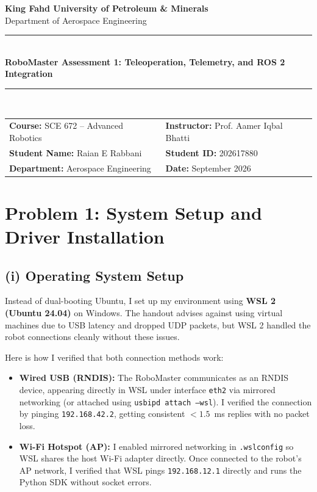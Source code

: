 \documentclass[11pt,a4paper]{article}
\begin{document}
\begin{center}
    {\Large \textbf{King Fahd University of Petroleum \& Minerals}}\\[0.15cm]
    {\large Department of Aerospace Engineering}\\[0.25cm]
    \rule{\textwidth}{0.8pt}\\[0.25cm]
    {\LARGE \textbf{RoboMaster Assessment 1: Teleoperation, Telemetry, and ROS 2 Integration}}\\[0.25cm]
    \rule{\textwidth}{0.8pt}\\[0.3cm]
    \begin{tabular}{ll}
        \textbf{Course:} SCE 672 -- Advanced Robotics & \textbf{Instructor:} Prof. Aamer Iqbal Bhatti \\
        \textbf{Student Name:} Raian E Rabbani & \textbf{Student ID:} 202617880 \\
        \textbf{Department:} Aerospace Engineering & \textbf{Date:} September 2026
    \end{tabular}
\end{center}
\vspace{0.2cm}

\section*{Problem 1: System Setup and Driver Installation}

\subsection*{(i) Operating System Setup}
Instead of dual-booting Ubuntu, I set up my environment using \textbf{WSL 2 (Ubuntu 24.04)} on Windows. The handout advises against using virtual machines due to USB latency and dropped UDP packets, but WSL 2 handled the robot connections cleanly without these issues.

Here is how I verified that both connection methods work:
\begin{itemize}[noitemsep,topsep=2pt]
    \item \textbf{Wired USB (RNDIS):} The RoboMaster communicates as an RNDIS device, appearing directly in WSL under interface \texttt{eth2} via mirrored networking (or attached using \texttt{usbipd attach --wsl}). I verified the connection by pinging \texttt{192.168.42.2}, getting consistent $<1.5$~ms replies with no packet loss.
    \item \textbf{Wi-Fi Hotspot (AP):} I enabled mirrored networking in \texttt{.wslconfig} so WSL shares the host Wi-Fi adapter directly. Once connected to the robot's AP network, I verified that WSL pings \texttt{192.168.12.1} directly and runs the Python SDK without socket errors.
\end{itemize}
\end{document}
